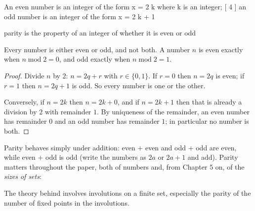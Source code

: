 \bpush\begin{bquote}

An even number is an
integer of the form x = 2 k where k is an integer; {[} 4 {]} an odd
number is an integer of the form x = 2 k + 1

\end{bquote}\bpop

\bpush\begin{bquote}

parity is the property of an
integer of whether it is even or odd

\end{bquote}\bpop

\bpush\begin{btheorem}\label{thm-even-odd}

Every number is either even or odd, and not both. A number \(n\) is even
exactly when \(n \operatorname{mod} 2 = 0\), and odd exactly when
\(n \operatorname{mod} 2 = 1\).

\end{btheorem}\bpop

\bpush\begin{proof}

Divide \(n\) by \(2\): \(n = 2q + r\) with \(r \in \{0, 1\}\). If
\(r = 0\) then \(n = 2q\) is even; if \(r = 1\) then \(n = 2q + 1\) is
odd. So every number is one or the other.

Conversely, if \(n = 2k\) then \(n = 2k + 0\), and if \(n = 2k + 1\)
then that is already a division by \(2\) with remainder \(1\). By
uniqueness of the remainder, an even number has remainder \(0\) and an
odd number has remainder \(1\); in particular no number is both.

\end{proof}\bpop

Parity behaves simply under addition: even \(+\) even and odd \(+\) odd
are even, while even \(+\) odd is odd (write the numbers as \(2a\) or
\(2a + 1\) and add). Parity matters throughout the paper, both of
numbers and, from Chapter 5 on, of the \emph{sizes of sets}:

\bpush\begin{bquote}

The theory behind involves
involutions on a finite set, especially the parity of the number of
fixed points in the involutions.

\end{bquote}\bpop


